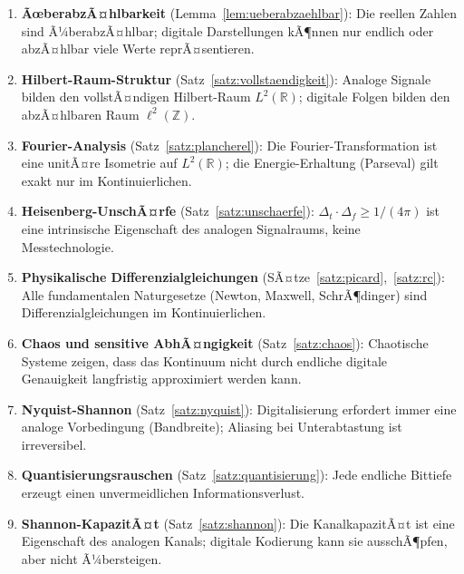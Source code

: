 ﻿\documentclass[a4paper,12pt]{article}
\theoremstyle{definition}
\begin{document}
\begin{enumerate}
\item \textbf{ÃœberabzÃ¤hlbarkeit} (Lemma~\ref{lem:ueberabzaehlbar}):
    Die reellen Zahlen sind Ã¼berabzÃ¤hlbar; digitale Darstellungen kÃ¶nnen nur
    endlich oder abzÃ¤hlbar viele Werte reprÃ¤sentieren.

\item \textbf{Hilbert-Raum-Struktur} (Satz~\ref{satz:vollstaendigkeit}):
    Analoge Signale bilden den vollstÃ¤ndigen Hilbert-Raum $L^2(\mathbb{R})$;
    digitale Folgen bilden den abzÃ¤hlbaren Raum $\ell^2(\mathbb{Z})$.

\item \textbf{Fourier-Analysis} (Satz~\ref{satz:plancherel}):
    Die Fourier-Transformation ist eine unitÃ¤re Isometrie auf $L^2(\mathbb{R})$;
    die Energie-Erhaltung (Parseval) gilt exakt nur im Kontinuierlichen.

\item \textbf{Heisenberg-UnschÃ¤rfe} (Satz~\ref{satz:unschaerfe}):
    $\Delta_t \cdot \Delta_f \geq 1/(4\pi)$ ist eine intrinsische Eigenschaft
    des analogen Signalraums, keine Messtechnologie.

\item \textbf{Physikalische Differenzialgleichungen}
    (SÃ¤tze~\ref{satz:picard},~\ref{satz:rc}):
    Alle fundamentalen Naturgesetze (Newton, Maxwell, SchrÃ¶dinger) sind
    Differenzialgleichungen im Kontinuierlichen.

\item \textbf{Chaos und sensitive AbhÃ¤ngigkeit} (Satz~\ref{satz:chaos}):
    Chaotische Systeme zeigen, dass das Kontinuum nicht durch endliche digitale
    Genauigkeit langfristig approximiert werden kann.

\item \textbf{Nyquist-Shannon} (Satz~\ref{satz:nyquist}):
    Digitalisierung erfordert immer eine analoge Vorbedingung (Bandbreite);
    Aliasing bei Unterabtastung ist irreversibel.

\item \textbf{Quantisierungsrauschen} (Satz~\ref{satz:quantisierung}):
    Jede endliche Bittiefe erzeugt einen unvermeidlichen Informationsverlust.

\item \textbf{Shannon-KapazitÃ¤t} (Satz~\ref{satz:shannon}):
    Die KanalkapazitÃ¤t ist eine Eigenschaft des analogen Kanals;
    digitale Kodierung kann sie ausschÃ¶pfen, aber nicht Ã¼bersteigen.
\end{enumerate}
\end{document}
